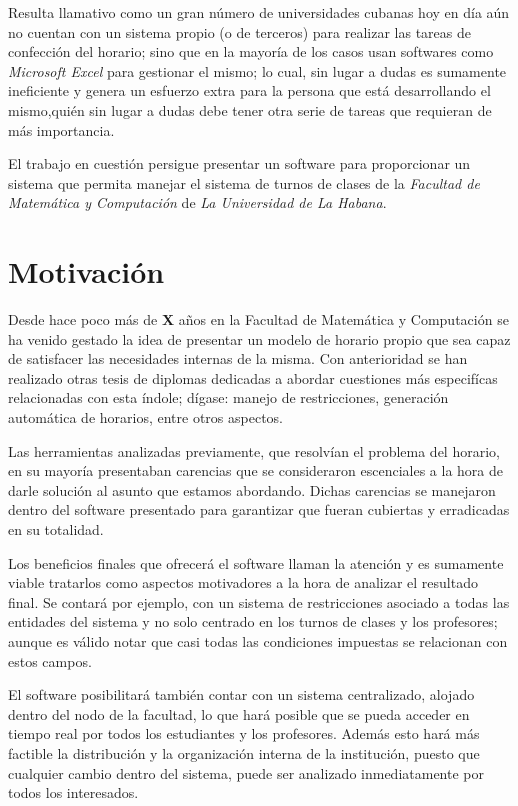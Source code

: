 \begin{introduction}
	Resulta llamativo como un gran número de universidades cubanas hoy en día aún no cuentan con un sistema propio (o de terceros) para realizar las tareas de confección del horario; sino que en la mayoría de los casos usan softwares como \textit{Microsoft Excel} para gestionar el mismo; lo cual, sin lugar a dudas es sumamente ineficiente y genera un esfuerzo extra para la persona que está desarrollando el mismo,quién sin lugar a dudas debe tener otra serie de tareas que requieran de más importancia.
	
	El trabajo en cuestión persigue presentar un software para proporcionar un sistema que permita manejar el sistema de turnos de clases de la \textit{Facultad de Matemática y Computación} de \textit{La Universidad de La Habana}.
	
	\section{Motivación}
	Desde hace poco más de \textbf{X} años en la Facultad de Matemática y Computación se ha venido gestado la idea de presentar un modelo de horario propio que sea capaz de satisfacer las necesidades internas de la misma. Con anterioridad se han realizado otras tesis de diplomas dedicadas a abordar cuestiones más especifícas relacionadas con esta índole; dígase: manejo de restricciones, generación automática de horarios, entre otros aspectos. 
	
	Las herramientas analizadas previamente, que resolvían el problema del horario, en su mayoría presentaban carencias que se consideraron escenciales a la hora de darle solución al asunto que estamos abordando. Dichas carencias se manejaron dentro del software presentado para garantizar que fueran cubiertas y erradicadas en su totalidad.
	
	Los beneficios finales que ofrecerá el software llaman la atención y es sumamente viable tratarlos como aspectos motivadores a la hora de analizar el resultado final. Se contará por ejemplo, con un sistema de restricciones asociado a todas las entidades del sistema y no solo centrado en los turnos de clases y los profesores; aunque es válido notar que casi todas las condiciones impuestas se relacionan con estos campos. 
	
	El software posibilitará también contar con un sistema centralizado, alojado dentro del nodo de la facultad, lo que hará posible que se pueda acceder en tiempo real por todos los estudiantes y los profesores. Además esto hará más factible la distribución y la organización interna de la institución, puesto que cualquier cambio dentro del sistema, puede ser analizado inmediatamente por todos los interesados.
	

\end{introduction}
